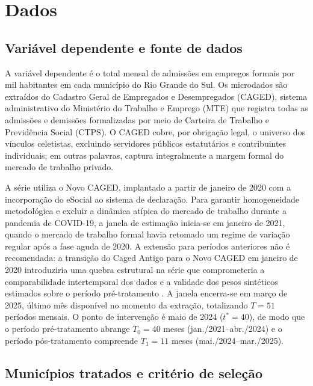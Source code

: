\documentclass[a4paper,12pt]{article}
\begin{document}
\section{Dados}
\label{sec:dados}


\subsection{Variável dependente e fonte de dados}
\label{sub:variaveis}

A variável dependente é o total mensal de admissões em empregos formais por mil
habitantes em cada município do Rio Grande do Sul. Os microdados são extraídos do
Cadastro Geral de Empregados e Desempregados (CAGED), sistema administrativo do
Ministério do Trabalho e Emprego (MTE) que registra todas as admissões e demissões
formalizadas por meio de Carteira de Trabalho e Previdência Social (CTPS). O CAGED
cobre, por obrigação legal, o universo dos vínculos celetistas, excluindo servidores
públicos estatutários e contribuintes individuais; em outras palavras, captura
integralmente a margem formal do mercado de trabalho privado.

A série utiliza o Novo CAGED, implantado a partir de janeiro de 2020 com a incorporação
do eSocial ao sistema de declaração. Para garantir homogeneidade metodológica e excluir
a dinâmica atípica do mercado de trabalho durante a pandemia de COVID-19, a janela de
estimação inicia-se em janeiro de 2021, quando o mercado de trabalho formal havia
retomado um regime de variação regular após a fase aguda de 2020. A extensão para
períodos anteriores não é recomendada: a transição do Caged Antigo para o Novo CAGED
em janeiro de 2020 introduziria uma quebra estrutural na série que comprometeria a
comparabilidade intertemporal dos dados e a validade dos pesos sintéticos estimados
sobre o período pré-tratamento \cite{brasil2019portaria}.
A janela encerra-se em março de 2025, último mês disponível no momento da extração,
totalizando $T = 51$ períodos mensais. O ponto de intervenção é maio de 2024
($t^* = 40$), de modo que o período pré-tratamento abrange $T_0 = 40$ meses
(jan./2021–abr./2024) e o período pós-tratamento compreende $T_1 = 11$ meses
(mai./2024–mar./2025).

\subsection{Municípios tratados e critério de seleção}
\label{sub:tratados}
\end{document}
